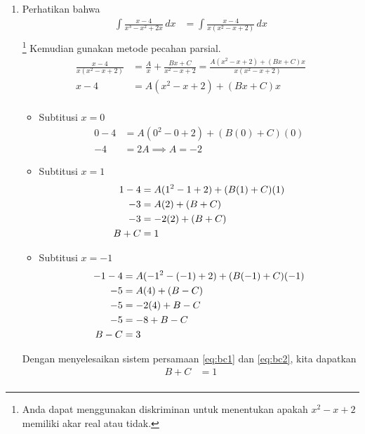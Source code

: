 \documentclass[11pt,openany,a4paper]{article}
\begin{document}
\begin{enumerate}
        \item Perhatikan bahwa
        \begin{align*}
          \int \frac{x - 4}{x^3 - x^2 + 2x} \, dx &= \int \frac{x - 4}{x(x^2 - x + 2)} \, dx \\
        \end{align*}\footnote{Anda dapat menggunakan diskriminan untuk menentukan apakah $x^2 - x + 2$ memiliki akar real atau tidak.}
        Kemudian gunakan metode pecahan parsial.
        \begin{align*}
          \frac{x - 4}{x(x^2 - x + 2)} &= \frac{A}{x} + \frac{Bx + C}{x^2 - x + 2} = \frac{A(x^2 - x + 2) + (Bx + C)x}{x(x^2 - x + 2)} \\
          x-4 &= A(x^2 - x + 2) + (Bx + C)x \\
        \end{align*}
        \begin{itemize}
          \item Subtitusi $x=0$
          \begin{align*}
            0 - 4 &= A(0^2 - 0 + 2) + (B(0) + C)(0) \\
            -4 &= 2A \implies A = -2
          \end{align*}
          \item Subtitusi $x=1$
          \begin{align}
            1 - 4 &= A(1^2 - 1 + 2) + (B(1) + C)(1) \notag \\
            -3 &= A(2) + (B + C)  \notag\\
            -3 &= -2(2) + (B + C) \notag \\
            B + C &= 1 \label{eq:bc1}
          \end{align}
          \item Subtitusi $x=-1$
          \begin{align}
            -1 - 4 &= A(-1^2 - (-1) + 2) + (B(-1) + C)(-1)  \notag\\
            -5 &= A(4) + (B - C)  \notag\\
            -5 &= -2(4) + B - C \notag \\
            -5 &= -8 + B - C  \notag\\
            B - C &= 3 \label{eq:bc2}
          \end{align}
        \end{itemize}
        Dengan menyelesaikan sistem persamaan \eqref{eq:bc1} dan \eqref{eq:bc2}, kita dapatkan
        \begin{align*}
          B + C &= 1 \\

\end{align*}
\end{enumerate}
\end{document}
